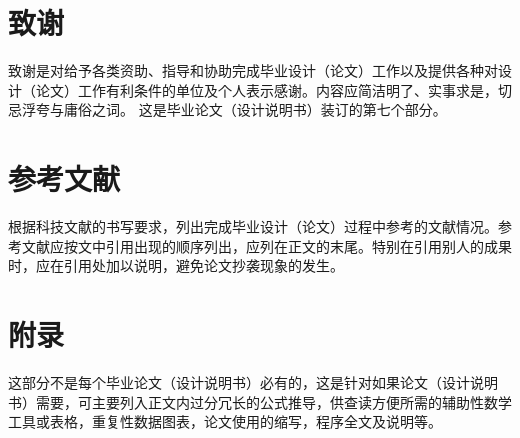 \section{致谢}
致谢是对给予各类资助、指导和协助完成毕业设计（论文）工作以及提供各种对设计（论文）工作有利条件的单位及个人表示感谢。内容应简洁明了、实事求是，切忌浮夸与庸俗之词。
这是毕业论文（设计说明书）装订的第七个部分。
\section{参考文献}
根据科技文献的书写要求，列出完成毕业设计（论文）过程中参考的文献情况。参考文献应按文中引用出现的顺序列出，应列在正文的末尾。特别在引用别人的成果时，应在引用处加以说明，避免论文抄袭现象的发生。
\section{附录}
这部分不是每个毕业论文（设计说明书）必有的，这是针对如果论文（设计说明书）需要，可主要列入正文内过分冗长的公式推导，供查读方便所需的辅助性数学工具或表格，重复性数据图表，论文使用的缩写，程序全文及说明等。